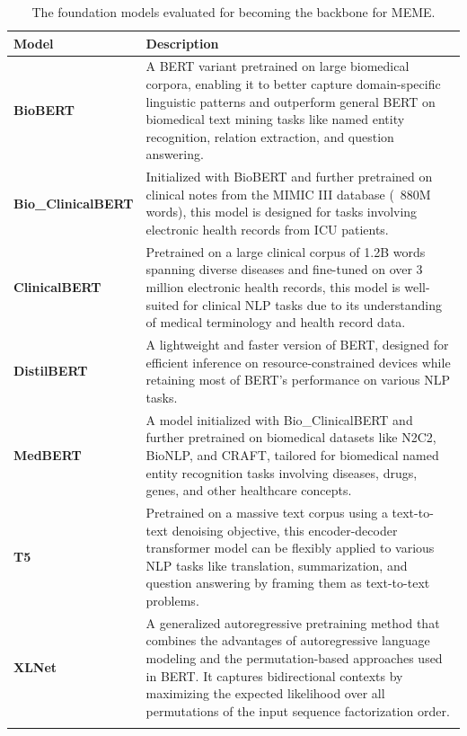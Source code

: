 \documentclass{article}
\theoremstyle{plain}
\theoremstyle{definition}
\theoremstyle{remark}
\begin{document}
{\begin{table}[H]
\centering
\caption{The foundation models evaluated for becoming the backbone for MEME.}
\begin{tabular}{p{6cm}p{8cm}}
\toprule
\textbf{Model} & \textbf{Description} \\
\midrule
\textbf{BioBERT} \citep{lee2020biobert} & A BERT variant pretrained on large biomedical corpora, enabling it to better capture domain-specific linguistic patterns and outperform general BERT on biomedical text mining tasks like named entity recognition, relation extraction, and question answering.\\
\midrule
\textbf{Bio\_ClinicalBERT} \citep{alsentzer2019publicly} & Initialized with BioBERT and further pretrained on clinical notes from the MIMIC III database (~880M words), this model is designed for tasks involving electronic health records from ICU patients.\\
\midrule
\textbf{ClinicalBERT} \citep{huang2019clinicalbert} & Pretrained on a large clinical corpus of 1.2B words spanning diverse diseases and fine-tuned on over 3 million electronic health records, this model is well-suited for clinical NLP tasks due to its understanding of medical terminology and health record data.\\
\midrule
\textbf{DistilBERT} \citep{sanh2019distilbert} & A lightweight and faster version of BERT, designed for efficient inference on resource-constrained devices while retaining most of BERT's performance on various NLP tasks.\\
\midrule
\textbf{MedBERT} \citep{9980157} & A model initialized with Bio\_ClinicalBERT and further pretrained on biomedical datasets like N2C2, BioNLP, and CRAFT, tailored for biomedical named entity recognition tasks involving diseases, drugs, genes, and other healthcare concepts.\\
\midrule
\textbf{T5} \citep{2020t5} & Pretrained on a massive text corpus using a text-to-text denoising objective, this encoder-decoder transformer model can be flexibly applied to various NLP tasks like translation, summarization, and question answering by framing them as text-to-text problems.\\
\midrule
\textbf{XLNet} \citep{yang2019xlnet} & A generalized autoregressive pretraining method that combines the advantages of autoregressive language modeling and the permutation-based approaches used in BERT. It captures bidirectional contexts by maximizing the expected likelihood over all permutations of the input sequence factorization order.\\
\bottomrule
\label{TableModel}
\end{tabular}
\end{table}

}
\end{document}
